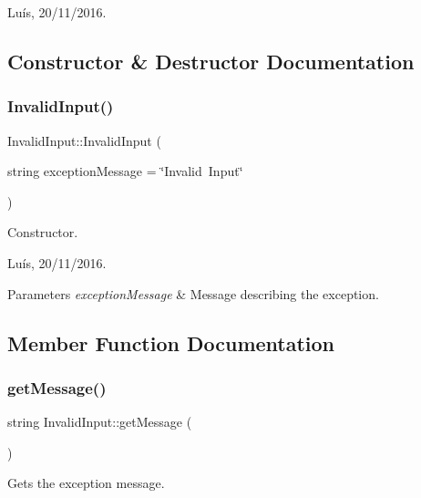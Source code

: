 Luís, 20/11/2016. 

\subsection{Constructor \& Destructor Documentation}
\hypertarget{class_invalid_input_a0b7eb468e727adcd94e87e5a8c0cf716}{}\label{class_invalid_input_a0b7eb468e727adcd94e87e5a8c0cf716} 
\subsubsection{\texorpdfstring{Invalid\+Input()}{InvalidInput()}}
{\footnotesize\ttfamily Invalid\+Input\+::\+Invalid\+Input (\begin{DoxyParamCaption}\item[{string}]{exception\+Message = {\ttfamily \char`\"{}Invalid~Input\char`\"{}} }\end{DoxyParamCaption})}



Constructor. 

Luís, 20/11/2016. 


\begin{DoxyParams}{Parameters}
{\em exception\+Message} & Message describing the exception. \\
\hline
\end{DoxyParams}


\subsection{Member Function Documentation}
\hypertarget{class_invalid_input_abe61234c3ad05ac96a76f6adbba4b377}{}\label{class_invalid_input_abe61234c3ad05ac96a76f6adbba4b377} 
\subsubsection{\texorpdfstring{get\+Message()}{getMessage()}}
{\footnotesize\ttfamily string Invalid\+Input\+::get\+Message (\begin{DoxyParamCaption}{ }\end{DoxyParamCaption})}



Gets the exception message. 

